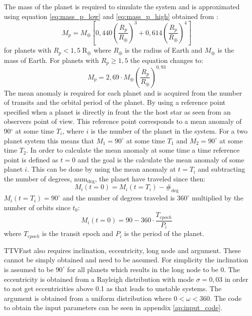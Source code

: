 \documentclass[12pt]{report}
\begin{document}
	The mass of the planet is required to simulate the system and is approximated using equation \ref{eq:mass_p_low} and \ref{eq:mass_p_high} obtained from \cite{2015ApJ...809...77S}:
	\begin{equation}
	\label{eq:mass_p_low}
	M_p = M_{\oplus} \left[0,440 \left(\frac{R_p}{R_{\oplus}}\right)^3 + 0,614\left(\frac{R_p}{R_{\oplus}}\right)^4\right]
	\end{equation}
	for planets with $R_p < 1,5 \; \mathrm{R_{\oplus}}$ where $R_{\oplus}$ is the radius of Earth and $M_{\oplus}$ is the mass of Earth. For planets with $R_p \geq 1,5$ the equation changes to:
	\begin{equation}
	\label{eq:mass_p_high}
	M_p = 2,69\cdot M_{\oplus}\left(\frac{R_p}{R_{\oplus}}\right)^{0,93}
	\end{equation}
	The mean anomaly is required for each planet and is acquired from the number of transits and the orbital period of the planet. By using a reference point specified when a planet is directly in front the the host star as seen from an observers point of view. This reference point corresponds to a mean anomaly of 90$^{\circ}$ at some time $T_i$, where $i$ is the number of the planet in the system. For a two planet system this means that $M_1=90^{\circ}$ at some time $T_1$ and $M_2=90^{\circ}$ at some time $T_2$. In order to calculate the mean anomaly at some time a time reference point is defined as $t=0$ and the goal is the calculate the mean anomaly of some planet $i$. This can be done by using the mean anomaly at $t = T_i$ and subtracting the number of degrees, $\mathrm{num_{deg}}$, the planet have traveled since then:
\begin{equation}
	M_i(t=0) = M_i(t=T_i) - \mathrm{\#_{deg}}
\end{equation}
	$M_i(t=T_i) = 90^{\circ}$ and the number of degrees traveled is $360^{\circ}$ multiplied by the number of orbits since $t_0$:
\begin{equation}
	M_i(t=0) = 90 - 360\cdot \frac{T_{epoch}}{P_i}
\end{equation}
	where $T_{epoch}$ is the transit epoch and $P_i$ is the period of the planet.
	
	TTVFast also requires inclination, eccentricity, long node and argument. These cannot be simply obtained and need to be assumed. For simplicity the inclination is assumed to be $90^{\circ}$ for all planets which results in the long node to be 0. The eccentricity is obtained from a Rayleigh distribution with mode $\sigma = 0,03$ in order to not get eccentricities above 0.1 as that leads to unstable systems. The argument is obtained from a uniform distribution where $0 < \omega < 360$. The code to obtain the input parameters can be seen in appendix \ref{ap:input_code}. 
	
\end{document}
